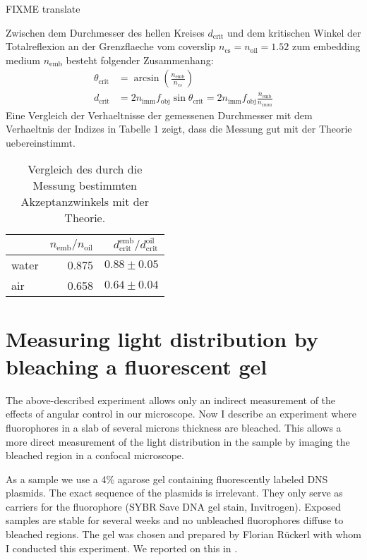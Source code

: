 FIXME translate

Zwischen dem Durchmesser des hellen Kreises $d_\textrm{crit}$ und dem
kritischen Winkel der Totalreflexion an der Grenzflaeche vom coverslip
$n_\textrm{cs}=n_\textrm{oil}=1.52$ zum embedding medium
$n_\textrm{emb}$ besteht folgender Zusammenhang:
\begin{align}
  \theta_\textrm{crit}&=\arcsin\left(\frac{n_\textrm{emb}}{n_{cs}}\right) \\
  d_\textrm{crit} &= 2 n_\textrm{imm} f_\textrm{obj}
  \sin\theta_\textrm{crit}= 2 n_\textrm{imm} f_\textrm{obj}
  \frac{n_\textrm{emb}}{n_{imm}}
\end{align}
Eine Vergleich der Verhaeltnisse der gemessenen Durchmesser mit dem
Verhaeltnis der Indizes in Tabelle 1 zeigt, dass die Messung gut mit
der Theorie uebereinstimmt.
\begin{table}[!hbt]
  \centering
  \begin{tabular}{ l r r }
    & $n_\textrm{emb}/n_\textrm{oil}$ & $d^\textrm{emb}_\textrm{crit}/ d^\textrm{oil}_\textrm{crit}$ \\  \hline
    water & 0.875 & $0.88\pm0.05$ \\
    air & 0.658 & $0.64\pm0.04$ 
  \end{tabular}
  \caption{Vergleich des durch die Messung bestimmten Akzeptanzwinkels mit der Theorie.}
  \label{tab:acceptance}
\end{table}


\section{Measuring light distribution by bleaching a fluorescent gel}
The above-described experiment allows only an indirect measurement of the
effects of angular control in our microscope. Now I describe an
experiment where fluorophores in a slab of several microns thickness
are bleached. This allows a more direct measurement of the light
distribution in the sample by imaging the bleached region in a
confocal microscope.

As a sample we use a 4\% agarose gel containing fluorescently labeled
DNS plasmids. The exact sequence of the plasmids is irrelevant. They
only serve as carriers for the fluorophore (SYBR Save DNA gel stain,
Invitrogen). Exposed samples are stable for several weeks and no
unbleached fluorophores diffuse to bleached regions. The gel was
chosen and prepared by Florian R\"uckerl with whom I conducted this
experiment. We reported on this in \cite{Ruckerl}.

